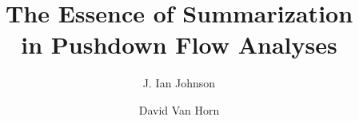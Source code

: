 \documentclass[article]{llncs}
\begin{document}
\title{The Essence of Summarization\\ in Pushdown Flow Analyses}
\author{J. Ian Johnson \and David Van Horn}


\maketitle

\begin{abstract}

\end{abstract}




\begin{small}


\end{small}

\iftr{\appendix{}}
\end{document}
